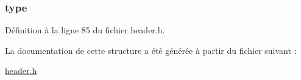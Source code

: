 \hypertarget{structt__character_a3b5fecb9824668aab778f82005089942}{
\subsubsection[{type}]{ type}}\label{structt__character_a3b5fecb9824668aab778f82005089942}


Définition à la ligne 85 du fichier header.\+h.



La documentation de cette structure a été générée à partir du fichier suivant \+:\begin{DoxyCompactItemize}
\item 
\hyperlink{header_8h}{header.\+h}\end{DoxyCompactItemize}
